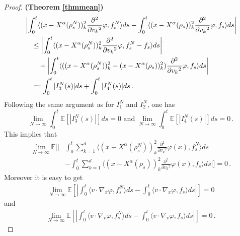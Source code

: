\documentclass{ims9x6}
\newcommand{\nn}{\nonumber}
\newcommand{\EE}{\mathbb{E}}
\newcommand{\la}{\langle}
\newcommand{\ra}{\rangle}
\begin{document}
\begin{proof}{\textbf{(Theorem \ref{thmmean})}}
	{\small \begin{align*}
		&\left|\int_0^t\la (x-X^\alpha(\rho_s^N))_k^2\frac{\partial^2}{\partial{v_k}^2}\varphi,f_s^N \ra ds -\int_0^t\la (x-X^\alpha(\rho_s))_k^2\frac{\partial^2}{\partial{v_k}^2}\varphi,f_s \ra ds \right|\notag\\
		&\quad \leq \left|\int_0^t\la (x-X^\alpha(\rho_s^N))_k^2\frac{\partial^2}{\partial{v_k}^2}\varphi,f_s^N-f_s\ra ds\right|\nn\\
		&\qquad +\left|\int_0^t\la ((x-X^\alpha(\rho_s^N))_k^2-(x-X^\alpha(\rho_s))_k^2)\frac{\partial^2}{\partial{v_k}^2}\varphi,f_s \ra ds \right| \notag\\
		&\quad =: \int_0^t |I_3^N(s)|ds+\int_0^t |I_4^N(s)|ds\,.
		\end{align*}}
	Following the same argument as for $I_1^N$ and $I_2^N$, one has
	\begin{equation}
	\lim\limits_{N\to \infty }\int_0^t \EE[|I_3^N(s)|]ds=0 \mbox{ and } \lim\limits_{N\to \infty }\int_0^t \EE[|I_4^N(s)|]ds=0\,.
	\end{equation}
	This implies that
	{\small 	\begin{equation}
	\label{est3}
	\begin{split}
		\lim_{N\rightarrow \infty}\EE\bigg[\bigg|&\int_0^t \sum_{k=1}^d\la (x-X^\alpha(\rho_s^N))_k^2\frac{\partial^2}{\partial{v_k}^2}\varphi(x),f_s^N \ra ds\\
		&-\int_0^t\sum_{k=1}^d\la (x-X^\alpha(\rho_s))_k^2\frac{\partial^2}{\partial{v_k}^2}\varphi(x),f_s \ra ds\bigg|\bigg]=0\,.
		\end{split}\end{equation}}
	Moreover it is easy to get
	\begin{align}\label{est4}
	\lim_{N\rightarrow \infty}\EE\left[\left|\int_0^t \la v \cdot \nabla_x\varphi, f_s^N\ra ds -\int_0^t \la v\cdot \nabla_x\varphi, f_s\ra ds\right|\right]=0
	\end{align}
	and
		\begin{align}\label{est5}
	\lim_{N\rightarrow \infty}\EE\left[\left|\int_0^t \la v \cdot \nabla_v\varphi, f_s^N\ra ds -\int_0^t \la v\cdot \nabla_v\varphi, f_s\ra ds\right|\right]=0\,.
	\end{align}	

\end{proof}
\end{document}
